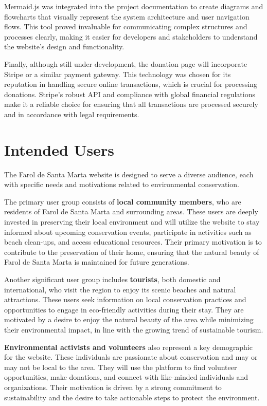 Mermaid.js was integrated into the project documentation to create diagrams and flowcharts that visually represent the system architecture and user navigation flows. This tool proved invaluable for communicating complex structures and processes clearly, making it easier for developers and stakeholders to understand the website’s design and functionality.

Finally, although still under development, the donation page will incorporate Stripe or a similar payment gateway. This technology was chosen for its reputation in handling secure online transactions, which is crucial for processing donations. Stripe's robust API and compliance with global financial regulations make it a reliable choice for ensuring that all transactions are processed securely and in accordance with legal requirements.

\section*{Intended Users}

The Farol de Santa Marta website is designed to serve a diverse audience, each with specific needs and motivations related to environmental conservation.

The primary user group consists of \textbf{local community members}, who are residents of Farol de Santa Marta and surrounding areas. These users are deeply invested in preserving their local environment and will utilize the website to stay informed about upcoming conservation events, participate in activities such as beach clean-ups, and access educational resources. Their primary motivation is to contribute to the preservation of their home, ensuring that the natural beauty of Farol de Santa Marta is maintained for future generations.

Another significant user group includes \textbf{tourists}, both domestic and international, who visit the region to enjoy its scenic beaches and natural attractions. These users seek information on local conservation practices and opportunities to engage in eco-friendly activities during their stay. They are motivated by a desire to enjoy the natural beauty of the area while minimizing their environmental impact, in line with the growing trend of sustainable tourism.

\textbf{Environmental activists and volunteers} also represent a key demographic for the website. These individuals are passionate about conservation and may or may not be local to the area. They will use the platform to find volunteer opportunities, make donations, and connect with like-minded individuals and organizations. Their motivation is driven by a strong commitment to sustainability and the desire to take actionable steps to protect the environment.

